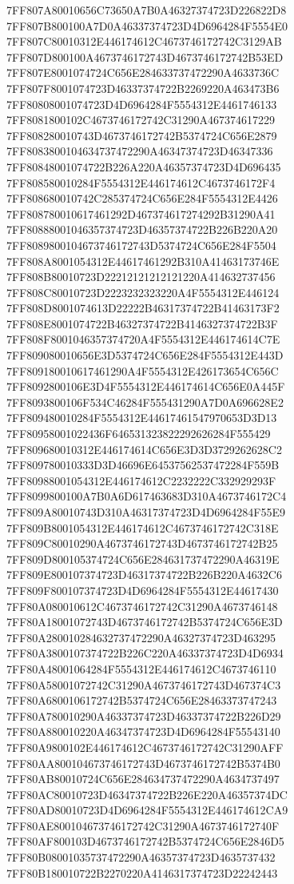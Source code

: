 7FF807A80010656C73650A7B0A46327374723D226822D8
7FF807B800100A7D0A46337374723D4D6964284F5554E0
7FF807C80010312E446174612C4673746172742C3129AB
7FF807D800100A4673746172743D4673746172742B53ED
7FF807E8001074724C656E284633737472290A4633736C
7FF807F8001074723D46337374722B2269220A463473B6
7FF80808001074723D4D6964284F5554312E4461746133
7FF8081800102C4673746172742C31290A467374617229
7FF808280010743D4673746172742B5374724C656E2879
7FF8083800104634737472290A46347374723D46347336
7FF80848001074722B226A220A46357374723D4D696435
7FF808580010284F5554312E446174612C4673746172F4
7FF808680010742C285374724C656E284F5554312E4426
7FF808780010617461292D467374617274292B31290A41
7FF80888001046357374723D46357374722B226B220A20
7FF8089800104673746172743D5374724C656E284F5504
7FF808A8001054312E44617461292B310A41463173746E
7FF808B80010723D22212121212121220A414632737456
7FF808C80010723D2223232323220A4F5554312E446124
7FF808D8001074613D22222B46317374722B41463173F2
7FF808E8001074722B46327374722B4146327374722B3F
7FF808F8001046357374720A4F5554312E446174614C7E
7FF809080010656E3D5374724C656E284F5554312E443D
7FF809180010617461290A4F5554312E426173654C656C
7FF8092800106E3D4F5554312E446174614C656E0A445F
7FF8093800106F534C46284F555431290A7D0A696628E2
7FF809480010284F5554312E44617461547970653D3D13
7FF80958001022436F646531323822292626284F555429
7FF809680010312E446174614C656E3D3D3729262628C2
7FF809780010333D3D46696E64537562537472284F559B
7FF80988001054312E446174612C2232222C332929293F
7FF8099800100A7B0A6D617463683D310A4673746172C4
7FF809A80010743D310A46317374723D4D6964284F55E9
7FF809B8001054312E446174612C4673746172742C318E
7FF809C80010290A4673746172743D4673746172742B25
7FF809D800105374724C656E284631737472290A46319E
7FF809E800107374723D46317374722B226B220A4632C6
7FF809F800107374723D4D6964284F5554312E44617430
7FF80A080010612C4673746172742C31290A4673746148
7FF80A18001072743D4673746172742B5374724C656E3D
7FF80A280010284632737472290A46327374723D463295
7FF80A3800107374722B226C220A46337374723D4D6934
7FF80A48001064284F5554312E446174612C4673746110
7FF80A58001072742C31290A4673746172743D467374C3
7FF80A6800106172742B5374724C656E28463373747243
7FF80A780010290A46337374723D46337374722B226D29
7FF80A880010220A46347374723D4D6964284F55543140
7FF80A9800102E446174612C4673746172742C31290AFF
7FF80AA800104673746172743D4673746172742B5374B0
7FF80AB80010724C656E284634737472290A4634737497
7FF80AC80010723D46347374722B226E220A46357374DC
7FF80AD80010723D4D6964284F5554312E446174612CA9
7FF80AE800104673746172742C31290A4673746172740F
7FF80AF800103D4673746172742B5374724C656E2846D5
7FF80B08001035737472290A46357374723D4635737432
7FF80B180010722B2270220A4146317374723D22242443
